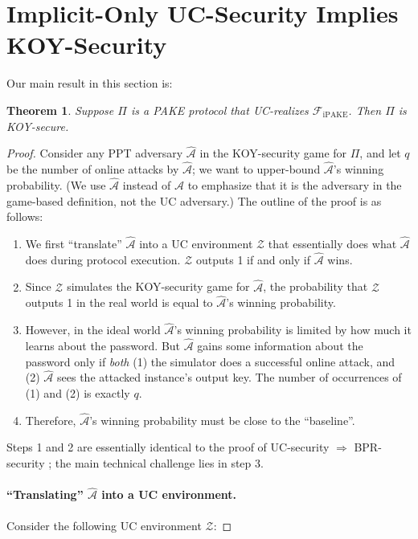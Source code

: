 \documentclass{article}
\newtheorem{theorem}{Theorem}
\newcommand{\adv}{\mathcal{A}}
\newcommand{\env}{\mathcal{Z}}
\newcommand{\func}{\mathcal{F}}
\newcommand{\Fipake}{\func_\mathrm{iPAKE}}
\begin{document}
\section{Implicit-Only UC-Security Implies KOY-Security}
\label{sec:implicit-only}
Our main result in this section is:
\begin{theorem}
Suppose $\Pi$ is a PAKE protocol that UC-realizes $\Fipake$. Then $\Pi$ is KOY-secure.
\end{theorem}
\begin{proof}
Consider any PPT adversary $\widehat{\adv}$ in the KOY-security game for $\Pi$, and let $q$ be the number of online attacks by $\widehat{\adv}$; we want to upper-bound $\widehat{\adv}$'s winning probability. (We use $\widehat{\adv}$ instead of $\adv$ to emphasize that it is the adversary in the game-based definition, not the UC adversary.) The outline of the proof is as follows:
\begin{enumerate}
  \item We first ``translate'' $\widehat{\adv}$ into a UC environment $\env$ that essentially does what $\widehat{\adv}$ does during protocol execution. $\env$ outputs 1 if and only if $\widehat{\adv}$ wins.
  \item Since $\env$ simulates the KOY-security game for $\widehat{\adv}$, the probability that $\env$ outputs 1 in the real world is equal to $\widehat{\adv}$'s winning probability.
  \item However, in the ideal world $\widehat{\adv}$'s winning probability is limited by how much it learns about the password. But $\widehat{\adv}$ gains some information about the password only if \emph{both} (1) the simulator does a successful online attack, and (2) $\widehat{\adv}$ sees the attacked instance's output key. The number of occurrences of (1) and (2) is exactly $q$.
  \item Therefore, $\widehat{\adv}$'s winning probability must be close to the ``baseline''.
\end{enumerate}
Steps 1 and 2 are essentially identical to the proof of UC-security $\Rightarrow$ BPR-security \cite{EC:CHKLM05}; the main technical challenge lies in step 3.
\paragraph{``Translating'' $\widehat{\adv}$ into a UC environment.}
Consider the following UC environment $\env$:


\end{proof}
\end{document}
